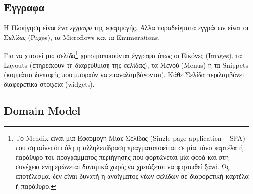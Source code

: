         \subsection{Έγγραφα}
        Η Πλοήγηση είναι ένα \textit{έγγραφο} της εφαρμογής. Άλλα παραδείγματα εγγράφων είναι οι Σελίδες (Pages), τα Microflows και τα Enumerations.

        Για να χτιστεί μια σελίδα\footnote{Το Mendix είναι μια Εφαρμογή Μίας Σελίδας (Single-page application -- SPA) που σημαίνει ότι όλη η αλληλεπίδραση πραγματοποιείται σε μία μόνο καρτέλα ή παράθυρο του προγράμματος περιήγησης που φορτώνεται μία φορά και στη συνέχεια ενημερώνεται δυναμικά χωρίς να χρειάζεται να φορτωθεί ξανά. Ως αποτέλεσμα, δεν είναι δυνατή η ανοίγματος νέων σελίδων σε διαφορετική καρτέλα ή παράθυρο.} χρησιμοποιούνται έγγραφα όπως οι Εικόνες (Images), τα Layouts (επηρεάζουν τη διαρρύθμιση της σελίδας), τα Μενού (Menus) ή τα Snippets (κομμάτια διεπαφής που μπορούν να επαναλαμβάνονται). Κάθε Σελίδα περιλαμβάνει διαφορετικά στοιχεία (widgets).



        \subsection{Domain Model} \label{sec:MendixDomainModel}